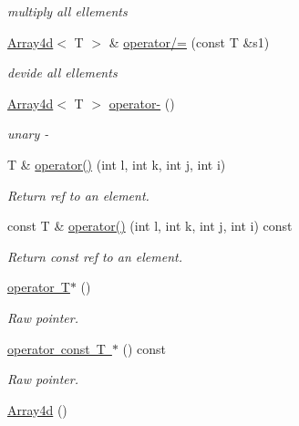 \begin{DoxyCompactItemize}
\begin{DoxyCompactList}\small\item\em multiply all ellements \end{DoxyCompactList}\item 
\mbox{\hyperlink{classXMLArray_1_1Array4d}{Array4d}}$<$ T $>$ \& \mbox{\hyperlink{classXMLArray_1_1Array4d_a22b262f7b7905313ae8e21d5e2d717a7}{operator/=}} (const T \&s1)
\begin{DoxyCompactList}\small\item\em devide all ellements \end{DoxyCompactList}\item 
\mbox{\hyperlink{classXMLArray_1_1Array4d}{Array4d}}$<$ T $>$ \mbox{\hyperlink{classXMLArray_1_1Array4d_a33d29c88630265c416d8e8a7355f166e}{operator-\/}} ()
\begin{DoxyCompactList}\small\item\em unary -\/ \end{DoxyCompactList}\item 
T \& \mbox{\hyperlink{classXMLArray_1_1Array4d_aed3f4e517b15358348150e8212189b60}{operator()}} (int l, int k, int j, int i)
\begin{DoxyCompactList}\small\item\em Return ref to an element. \end{DoxyCompactList}\item 
const T \& \mbox{\hyperlink{classXMLArray_1_1Array4d_ae9076800aed9ec98d434d01fcaf4ba3a}{operator()}} (int l, int k, int j, int i) const
\begin{DoxyCompactList}\small\item\em Return const ref to an element. \end{DoxyCompactList}\item 
\mbox{\hyperlink{classXMLArray_1_1Array4d_a25e918248c9191d04788cce2e0116bf1}{operator T$\ast$}} ()
\begin{DoxyCompactList}\small\item\em Raw pointer. \end{DoxyCompactList}\item 
\mbox{\hyperlink{classXMLArray_1_1Array4d_abe07755f692bf1df5acf5b8b9cd266cb}{operator const T $\ast$}} () const
\begin{DoxyCompactList}\small\item\em Raw pointer. \end{DoxyCompactList}\item 
\mbox{\hyperlink{classXMLArray_1_1Array4d_a4ce7f5a0bcb93fd0bd98a5fa0eb09a3d}{Array4d}} ()

\end{DoxyCompactItemize}
